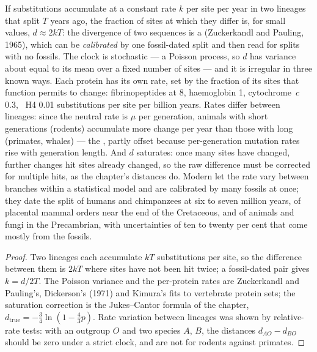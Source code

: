 \begin{proposition}\label{prop:b3:molecular-evolution:clock}
If substitutions accumulate at a constant rate $k$ per site per year in
two lineages that split $T$ years ago, the fraction of sites at which
they differ is, for small values, $d \approx 2kT$: the divergence of
two sequences is a \emph{} (Zuckerkandl and Pauling,
1965), which can be \emph{calibrated} by one fossil-dated split and then
read for splits with no fossils. The clock is stochastic --- a Poisson
process, so $d$ has variance about equal to its mean over a fixed
number of sites --- and it is irregular in three known ways. Each
protein has its own rate, set by the fraction of its sites that
function permits to change: fibrinopeptides at \num{8}, haemoglobin
\num{1}, cytochrome~$c$ \num{0.3}, ~H4 \num{0.01} substitutions
per site per billion years. Rates differ between lineages: since the
neutral rate is $\mu$ per generation, animals with short generations
(rodents) accumulate more change per year than those with long
(primates, whales) --- the \emph{}, partly offset
because per-generation mutation rates rise with generation length.
And $d$ saturates: once many sites have changed, further changes hit
sites already changed, so the raw difference must be corrected for
multiple hits, as the  chapter's distances do. Modern
\emph{} let the rate vary between branches within a
statistical model and are calibrated by many fossils at once; they
date the split of humans and chimpanzees at six to seven million
years, of placental mammal orders near the end of the Cretaceous, and
of animals and fungi in the Precambrian, with uncertainties of ten to
twenty per cent that come mostly from the fossils.
\end{proposition}
\begin{proof}
Two lineages each accumulate $kT$ substitutions per site, so the
difference between them is $2kT$ where sites have not been hit twice;
a fossil-dated pair gives $k = d/2T$. The Poisson variance and the
per-protein rates are Zuckerkandl and Pauling's, Dickerson's (1971) and
Kimura's fits to vertebrate protein sets; the saturation correction is
the Jukes--Cantor formula of the  chapter, $d_{\text{true}} =
-\tfrac{3}{4}\ln(1 - \tfrac{4}{3}p)$. Rate variation between lineages
was shown by relative-rate tests: with an outgroup $O$ and two species
$A$, $B$, the distances $d_{AO} - d_{BO}$ should be zero under a strict
clock, and are not for rodents against primates.
\end{proof}

